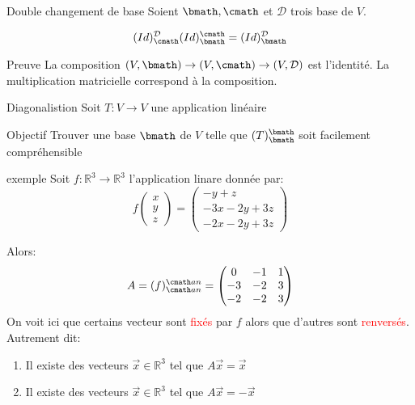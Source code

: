 \begin{parag}{Double changement de base}
    Soient $\bmath, \cmath$ et $\mathcal{D}$ trois base de $V$.
    \begin{formule}
        \[(Id)_\cmath^{\mathcal{D}}(Id)_\bmath^\cmath = (Id)_\bmath^{\mathcal{D}}\]
    \end{formule}
    \begin{subparag}{Preuve}
        La composition $(V, \bmath) \to (V, \cmath) \to (V, \mathcal{D})$ est l'identité. La multiplication matricielle correspond à la composition.
    \end{subparag}
\end{parag}

\begin{parag}{Diagonalistion}
    Soit $T: V \to V$ une application linéaire
    \begin{subparag}{Objectif}
        Trouver une base $\bmath$ de $V$ telle que $(T)_\bmath^\bmath$ soit facilement compréhensible
    \end{subparag}
    \begin{subparag}{exemple}
        Soit $f : \mathbb{R}^3 \to \mathbb{R}^3$ l'application linare donnée par:
        \[f\begin{pmatrix}
            x \\ y \\ z
        \end{pmatrix} = \begin{pmatrix}
            -y + z \\ -3x -2y + 3z\\
            -2x -2y + 3z
        \end{pmatrix}\]

        Alors:
        \[A = (f)_{\cmath an} ^{\cmath an} = \begin{pmatrix}
            0 & -1 & 1\\
            -3 & -2 & 3\\
            -2 & -2 & 3
        \end{pmatrix} \]
        On voit ici que certains vecteur sont \textcolor{red}{fixés} par $f$ alors que d'autres sont \textcolor{red}{renversés}.\\
        Autrement dit:
        \begin{enumerate}
            \item Il existe des vecteurs $\vec{x} \in \mathbb{R}^3$ tel que $A\vec{x} = \vec{x}$
            \item Il existe des vecteurs $\vec{x} \in \mathbb{R}^3$ tel que $A\vec{x} = -\vec{x}$
        \end{enumerate}
        


\end{subparag}
\end{parag}
